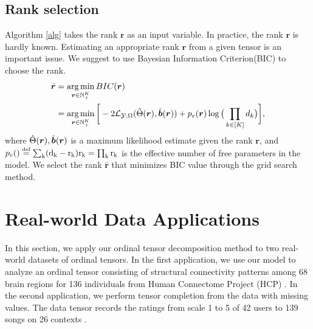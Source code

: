 \documentclass{article}
\theoremstyle{plain}
\theoremstyle{definition}
\begin{document}
\subsection{Rank selection}
Algorithm \ref{alg} takes  the rank $\bm r$ as an input variable. In practice, the rank $\bm r$ is hardly known. Estimating an appropriate rank $\bm r$ from a given tensor is an important issue. We suggest to use Bayesian Information Criterion(BIC) to choose the rank.
\begin{equation}
    \label{bic}
    \begin{aligned}
        \hat{\bm r} &= \operatorname*{arg\,min}_{\bm r\in \mathbb{N}_+^K} BIC(\bm r)\\
        &=\operatorname*{arg\,min}_{\bm r\in \mathbb{N}_+^K}\bigg[-2\mathcal{L}_{\mathcal{Y},\Omega}(\hat\Theta(\bm r),\hat{\bm{b}}(\bm{r})) +
        p_e(\bm{r})\log\big(\prod_{k\in[K]} d_k\big)\bigg],
    \end{aligned}
\end{equation}
where $\hat\Theta(\bm r),\hat{\bm{b}}(\bm{r})$ is a maximum likelihood estimate given the rank $\bm r$, and $p_e(\rm)\eqdef \sum_k(d_k-r_k)r_k = \prod_k r_k$ is the effective number of free parameters in the model. We select the rank $\hat{\bm r}$ that minimizes BIC value through the grid search method.
\section{Real-world Data Applications}
In this section, we apply our ordinal tensor decomposition method to two real-world datasets of ordinal tensors. In the first application, we use our model to analyze an ordinal tensor consisting of structural connectivity patterns among 68 brain regions for 136 individuals from Human Connectome Project (HCP) \citep{geddes2016human}. In the second application, we perform tensor completion from the data with missing values. The data tensor records the ratings from scale 1 to 5 of 42 users to 139 songs on 26 contexts \citep{baltrunas2011incarmusic}.
\end{document}
